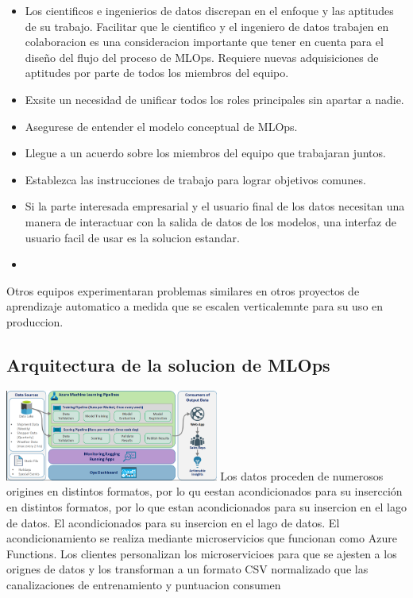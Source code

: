 \documentclass[twoside,twocolumn]{article}
\begin{document}
\begin{itemize}
    \item Los cientificos e ingenierios de datos discrepan en el enfoque y las aptitudes de su trabajo. Facilitar que le cientifico y el ingeniero de datos trabajen en colaboracion es una consideracion importante que tener en cuenta para el diseño del flujo del proceso de MLOps. Requiere nuevas adquisiciones de aptitudes por parte de todos los miembros del equipo.
    \item Exsite un necesidad de unificar todos los roles principales sin apartar a nadie.
    \item Asegurese de entender el modelo conceptual de MLOps.
    \item Llegue a un acuerdo sobre los miembros del equipo que trabajaran juntos.
    \item Establezca las instrucciones de trabajo para lograr objetivos comunes.
    \item Si la parte interesada empresarial y el usuario final de los datos necesitan una manera de interactuar con la salida de datos de los modelos, una interfaz de usuario facil de usar es la solucion estandar.
    \item 
\end{itemize}
Otros equipos experimentaran problemas similares en otros proyectos de aprendizaje automatico a medida que se escalen verticalemnte para su uso en produccion.

\subsection{Arquitectura de la solucion de MLOps}
\includegraphics[width=7cm]{imagenes/imagen2.png}
Los datos proceden de numerosos origines en distintos formatos, por lo qu eestan acondicionados para su insercción en distintos formatos, por lo que estan acondicionados para su insercion en el lago de datos.
El acondicionados para su insercion en el lago de datos. El acondicionamiento se realiza mediante microservicios que funcionan como Azure Functions. Los clientes personalizan los microservicioes para que se ajesten a los orignes de datos y los transforman a un formato CSV normalizado que las canalizaciones de entrenamiento
y puntuacion consumen
\end{document}
